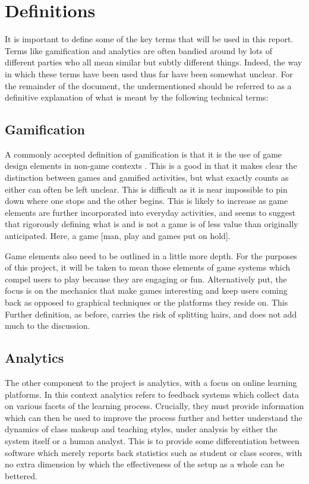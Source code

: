 \documentclass{article}
\begin{document}
\section{Definitions}
It is important to define some of the key terms that will be used in this report. Terms like gamification and analytics are often bandied around by lots of different parties who all mean similar but subtly different things. Indeed, the way in which these terms have been used thus far have been somewhat unclear. For the remainder of the document, the undermentioned should be referred to as a definitive explanation of what is meant by the following technical terms:

\subsection{Gamification}
A commonly accepted definition of gamification is that it is the use of game design elements in non-game contexts \cite{deterding2011game}. This is a good in that it makes clear the distinction between games and gamified activities, but what exactly counts as either can often be left unclear. This is difficult as it is near impossible to pin down where one stops and the other begins. This is likely to increase as game elements are further incorporated into everyday activities, and seems to suggest that rigorously defining what is and is not a game is of less value than originally anticipated. Here, a game [man, play and games put on hold].

Game elements also need to be outlined in a little more depth. For the purposes of this project, it will be taken to mean those elements of game systems which compel users to play because they are engaging or fun. Alternatively put, the focus is on the mechanics that make games interesting and keep users coming back as opposed to graphical techniques or the platforms they reside on. This  Further definition, as before, carries the risk of splitting hairs, and does not add much to the discussion.

\subsection{Analytics}
The other component to the project is analytics, with a focus on online learning platforms. In this context analytics refers to feedback systems which collect data on various facets of the learning process. Crucially, they must provide information which can then be used to improve the process further and better understand the dynamics of class makeup and teaching styles, under analysis by either the system itself or a human analyst. This is to provide some differentiation between software which merely reports back statistics such as student or class scores, with no extra dimension by which the effectiveness of the setup as a whole can be bettered. 
\end{document}
